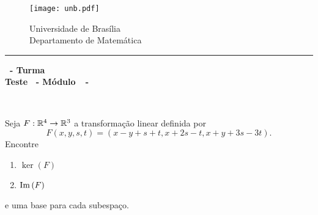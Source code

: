 \documentclass[12pt]{exam}
\begin{document}
    \begin{figure}[h]
        \begin{minipage}[c]{1.7cm}
            \texttt{[image: unb.pdf]}
        \end{minipage}
        \hspace{0pt}
        \begin{minipage}[c]{4in}
            {Universidade de Brasília} \\
            {Departamento de Matemática}
        \end{minipage}
    \end{figure}
    \hrule
    \begin{center}
        {\Large\bf \disciplina\ - Turma \turma}  \\
         {\large\bf Teste \numeroteste\ - Módulo\ \modulo\ -\ \dataavaliacao}
    \end{center}

    \\
    \vspace*{.01cm}

    \vspace{.4cm}

    \questao{} Seja $F : \mathbb{R}^4 \to \mathbb{R}^3$ a transformação linear definida por
    \[
        F(x,y,s,t) = (x - y + s + t, x + 2s - t, x + y + 3s - 3t).
    \]
    Encontre
    \begin{enumerate}[label={\alph*})]
        \item $\ker(F)$

        \item ${\rm Im\,}(F)$
    \end{enumerate}
    e uma base para cada subespaço.
\end{document}
